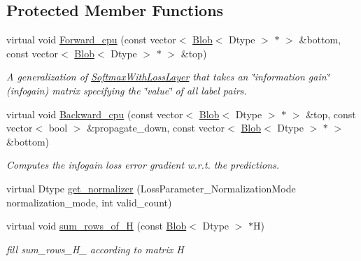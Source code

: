 \subsection*{Protected Member Functions}
\begin{DoxyCompactItemize}
\item 
virtual void \hyperlink{classcaffe_1_1InfogainLossLayer_a33234c8a1d0182dbb20ca3d69687bf65}{Forward\+\_\+cpu} (const vector$<$ \hyperlink{classcaffe_1_1Blob}{Blob}$<$ Dtype $>$ $\ast$ $>$ \&bottom, const vector$<$ \hyperlink{classcaffe_1_1Blob}{Blob}$<$ Dtype $>$ $\ast$ $>$ \&top)
\begin{DoxyCompactList}\small\item\em A generalization of \hyperlink{classcaffe_1_1SoftmaxWithLossLayer}{Softmax\+With\+Loss\+Layer} that takes an \char`\"{}information gain\char`\"{} (infogain) matrix specifying the \char`\"{}value\char`\"{} of all label pairs. \end{DoxyCompactList}\item 
virtual void \hyperlink{classcaffe_1_1InfogainLossLayer_aa17e25c5b0a4a485b5c09456136c9415}{Backward\+\_\+cpu} (const vector$<$ \hyperlink{classcaffe_1_1Blob}{Blob}$<$ Dtype $>$ $\ast$ $>$ \&top, const vector$<$ bool $>$ \&propagate\+\_\+down, const vector$<$ \hyperlink{classcaffe_1_1Blob}{Blob}$<$ Dtype $>$ $\ast$ $>$ \&bottom)
\begin{DoxyCompactList}\small\item\em Computes the infogain loss error gradient w.\+r.\+t. the predictions. \end{DoxyCompactList}\item 
virtual Dtype \hyperlink{classcaffe_1_1InfogainLossLayer_a0e5e9667b19fb88ece7298e3e83d2fdb}{get\+\_\+normalizer} (Loss\+Parameter\+\_\+\+Normalization\+Mode normalization\+\_\+mode, int valid\+\_\+count)
\item 
virtual void \hyperlink{classcaffe_1_1InfogainLossLayer_a030296e6af30acd17a3cfe4463456147}{sum\+\_\+rows\+\_\+of\+\_\+H} (const \hyperlink{classcaffe_1_1Blob}{Blob}$<$ Dtype $>$ $\ast$H)\hypertarget{classcaffe_1_1InfogainLossLayer_a030296e6af30acd17a3cfe4463456147}{}\label{classcaffe_1_1InfogainLossLayer_a030296e6af30acd17a3cfe4463456147}

\begin{DoxyCompactList}\small\item\em fill sum\+\_\+rows\+\_\+\+H\+\_\+ according to matrix H \end{DoxyCompactList}\end{DoxyCompactItemize}
